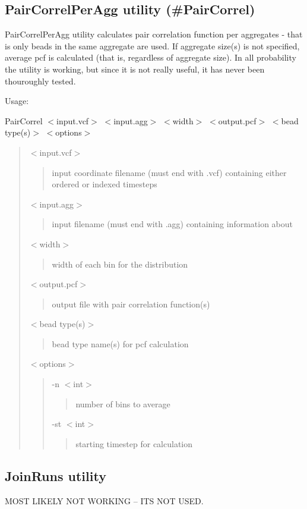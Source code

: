 \subsection*{Pair\+Correl\+Per\+Agg utility (\#\+Pair\+Correl)}

Pair\+Correl\+Per\+Agg utility calculates pair correlation function per aggregates -\/ that is only beads in the same aggregate are used. If aggregate size(s) is not specified, average pcf is calculated (that is, regardless of aggregate size). In all probability the utility is working, but since it is not really useful, it has never been thouroughly tested.

Usage\+:

{\ttfamily Pair\+Correl $<$input.\+vcf$>$ $<$input.\+agg$>$ $<$width$>$ $<$output.\+pcf$>$ $<$bead type(s)$>$ $<$options$>$}

\begin{quote}
{\ttfamily $<$input.\+vcf$>$} \begin{quote}
input coordinate filename (must end with {\ttfamily .vcf}) containing either ordered or indexed timesteps \end{quote}
{\ttfamily $<$input.\+agg$>$} \begin{quote}
input filename (must end with {\ttfamily .agg}) containing information about \end{quote}
{\ttfamily $<$width$>$} \begin{quote}
width of each bin for the distribution \end{quote}
{\ttfamily $<$output.\+pcf$>$} \begin{quote}
output file with pair correlation function(s) \end{quote}
{\ttfamily $<$bead type(s)$>$} \begin{quote}
bead type name(s) for pcf calculation \end{quote}
{\ttfamily $<$options$>$} \begin{quote}
{\ttfamily -\/n $<$int$>$} \begin{quote}
number of bins to average \end{quote}
{\ttfamily -\/st $<$int$>$} \begin{quote}
starting timestep for calculation \end{quote}
\end{quote}
\end{quote}
\hypertarget{Common_JoinRuns}{}\subsection{Join\+Runs utility}\label{Common_JoinRuns}
M\+O\+ST L\+I\+K\+E\+LY N\+OT W\+O\+R\+K\+I\+NG -- IT\textquotesingle{}S N\+OT U\+S\+ED.

